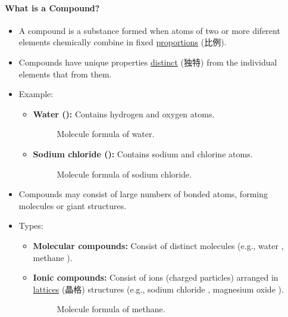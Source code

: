 \paragraph{What is a Compound?}
\begin{itemize}
    \item A compound is a substance formed when atoms of two or more diferent elements chemically combine in fixed
    \underline{proportions} (比例).
    \item Compounds have unique properties \underline{distinct} (独特) from the individual elements that from them.
    \item Example:
    \begin{itemize}
        \item \textbf{Water ():} Contains hydrogen and oxygen atoms.
        \begin{figure}[H]
            \centering
            \caption{Molecule formula of water.}
        \end{figure}
        \item \textbf{Sodium chloride ():} Contains sodium and chlorine atoms.
        \begin{figure}[H]
            \centering
            \caption{Molecule formula of sodium chloride.}
        \end{figure}
    \end{itemize}
    \item Compounds may consist of large numbers of bonded atoms, forming molecules or giant structures.
    \item Types:
    \begin{itemize}
        \item \textbf{Molecular compounds:} Consist of distinct molecules (e.g., water , methane ).
        \item \textbf{Ionic compounds:} Consist of ions (charged particles) arranged in \underline{lattices} (晶格) structures
        (e.g., sodium chloride , magnesium oxide ).
        \begin{figure}[H]
            \centering
            \caption{Molecule formula of methane.}
        \end{figure}
    \end{itemize}
\end{itemize}

